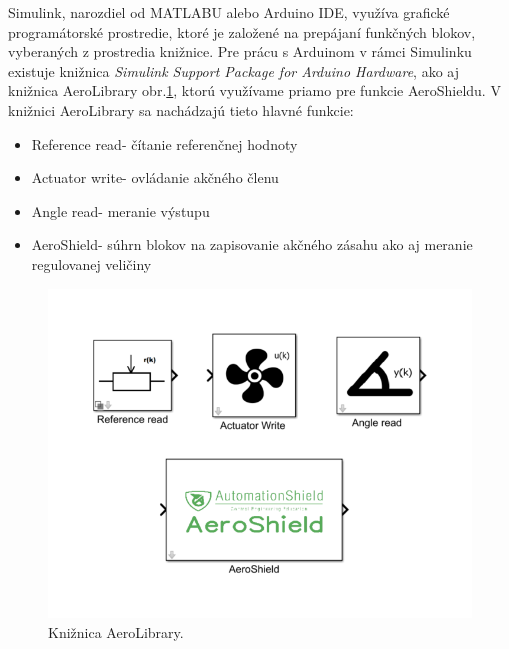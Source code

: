 Simulink, narozdiel od MATLABU alebo Arduino IDE, využíva grafické programátorské prostredie, ktoré je založené na prepájaní funkčných blokov, vyberaných z prostredia knižnice. Pre prácu s Arduinom v rámci Simulinku existuje knižnica \textit{Simulink Support Package for Arduino Hardware}, ako aj knižnica AeroLibrary obr.\ref{OBRAZOK 2.6.4}, ktorú využívame priamo pre funkcie AeroShieldu. V knižnici AeroLibrary sa nachádzajú tieto hlavné funkcie: 
\begin{itemize}
\item Reference read- čítanie referenčnej hodnoty 
\item Actuator write- ovládanie akčného členu 
\item Angle read- meranie výstupu 
\item AeroShield- súhrn blokov na zapisovanie akčného zásahu ako aj meranie regulovanej veličiny
\end{itemize}

\begin{figure}[!tbh]
	\centering
	\includegraphics[width=125mm]{obr/AeroLib.png}
	\caption{Knižnica AeroLibrary.}\label{OBRAZOK 2.6.4}
\end{figure}